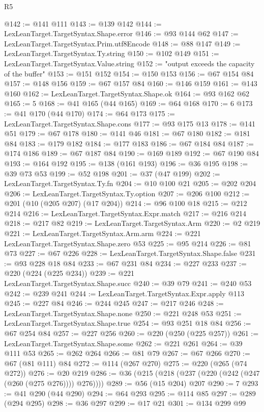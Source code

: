 \begin{lexlean}{R5}
\begin{coremodule}
@142 := @141 @111
@143 := @139 @142
@144 := LexLeanTarget.TargetSyntax.Shape.error
@146 := @93 @144 @62
@147 := LexLeanTarget.TargetSyntax.Prim.utf8Encode
@148 := @88 @147
@149 := LexLeanTarget.TargetSyntax.Ty.string
@150 := @102 @149
@151 := LexLeanTarget.TargetSyntax.Value.string
@152 := "output exceeds the capacity of the buffer"
@153 := @151 @152
@154 := @150 @153
@156 := @67 @154 @84
@157 := @148 @156
@159 := @67 @157 @84
@160 := @146 @159
@161 := @143 @160
@162 := LexLeanTarget.TargetSyntax.Shape.ok
@164 := @93 @162 @62
@165 := 5
@168 := @41 @165 (@44 @165)
@169 := @64 @168
@170 := 6
@173 := @41 @170 (@44 @170)
@174 := @64 @173
@175 := LexLeanTarget.TargetSyntax.Shape.cons
@177 := @93 @175 @13
@178 := @141 @51
@179 := @67 @178
@180 := @141 @46
@181 := @67 @180
@182 := @181 @84
@183 := @179 @182
@184 := @177 @183
@186 := @67 @184 @84
@187 := @174 @186
@189 := @67 @187 @84
@190 := @169 @189
@192 := @67 @190 @84
@193 := @164 @192
@195 := @138 (@161 @193)
@196 := @36 @195
@198 := @39 @73 @53
@199 := @52 @198
@201 := @37 (@47 @199)
@202 := LexLeanTarget.TargetSyntax.Ty.fn
@204 := @10 @100 @21
@205 := @202 @204
@206 := LexLeanTarget.TargetSyntax.Ty.option
@207 := @206 @100
@212 := @201 (@10 (@205 @207) (@17 @204))
@214 := @96 @100 @18
@215 := @212 @214
@216 := LexLeanTarget.TargetSyntax.Expr.match
@217 := @216 @214
@218 := @217 @82
@219 := LexLeanTarget.TargetSyntax.Arm
@220 := @2 @219
@221 := LexLeanTarget.TargetSyntax.Arm.arm
@224 := @221 LexLeanTarget.TargetSyntax.Shape.zero @53
@225 := @95 @214
@226 := @81 @73
@227 := @67 @226
@228 := LexLeanTarget.TargetSyntax.Shape.false
@231 := @93 @228 @18 @84
@233 := @67 @231 @84
@234 := @227 @233
@237 := @220 (@224 (@225 @234))
@239 := @221 LexLeanTarget.TargetSyntax.Shape.succ
@240 := @39 @79
@241 := @240 @53
@242 := @239 @241
@244 := LexLeanTarget.TargetSyntax.Expr.apply @113
@245 := @227 @84
@246 := @244 @245
@247 := @217 @246
@248 := LexLeanTarget.TargetSyntax.Shape.none
@250 := @221 @248 @53
@251 := LexLeanTarget.TargetSyntax.Shape.true
@254 := @93 @251 @18 @84
@256 := @67 @254 @84
@257 := @227 @256
@260 := @220 (@250 (@225 @257))
@261 := LexLeanTarget.TargetSyntax.Shape.some
@262 := @221 @261
@264 := @39 @111 @53
@265 := @262 @264
@266 := @81 @79
@267 := @67 @266
@270 := @67 (@81 @111) @84
@272 := @114 (@267 @270)
@275 := @220 (@265 (@74 @272))
@276 := @20 @219
@286 := @36 (@215 (@218 (@237 (@220 (@242 (@247 (@260 (@275 @276)))) @276))))
@289 := @56 (@15 @204) @207
@290 := 7
@293 := @41 @290 (@44 @290)
@294 := @64 @293
@295 := @114 @85
@297 := @289 (@294 @295)
@298 := @36 @297
@299 := @17 @21
@301 := @134 @299 @99

\end{coremodule}
\end{lexlean}
